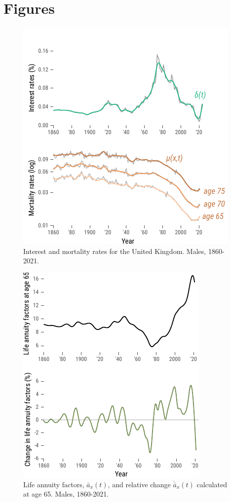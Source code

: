 \documentclass[12pt]{article}
\begin{document}


\newpage

\FloatBarrier
\section{Figures}

\begin{figure}[!ht]
	\centering
	\includegraphics[width=0.5\linewidth]{Fig/interestMortalityRates}
	\caption{{Interest and mortality rates for the United Kingdom. Males, 1860-2021.}}
	\label{fig:Fig1}
\end{figure}


 \begin{figure}[!ht]
	\centering
	\includegraphics[width=0.5\linewidth]{Fig/lifeAnnuityFactorsAndChanges}
	\caption{{Life annuity factors, $\bar{a}_x(t)$, and relative change $\acute{\bar{a}}_x(t)$ calculated at age 65. Males, 1860-2021.}}
	\label{fig:Fig2}
\end{figure}
\end{document}
